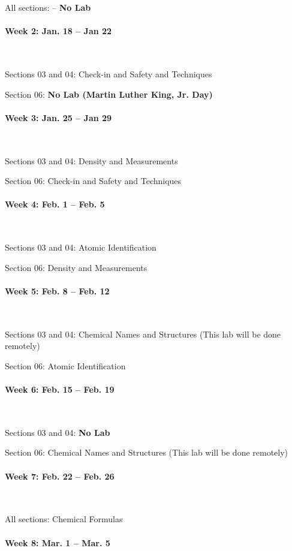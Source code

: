 \documentclass[12pt, letterpaper]{article}
\begin{document}
All sections: -- \textbf{No Lab}

\paragraph{Week 2: Jan. 18 -- Jan 22}~ 

Sections 03 and 04: Check-in and Safety and Techniques

Section 06: \textbf{No Lab (Martin Luther King, Jr. Day)}

\paragraph{Week 3:  Jan. 25 -- Jan 29}~

Sections 03 and 04:  Density and Measurements

Section 06: Check-in and Safety and Techniques

\paragraph{Week 4: Feb. 1 -- Feb. 5}~

Sections 03 and 04: Atomic Identification

Section 06: Density and Measurements

\paragraph{Week 5: Feb. 8 -- Feb. 12}~

Sections 03 and 04:  Chemical Names and Structures (This lab will be done remotely)

Section 06: Atomic Identification

\paragraph{Week 6: Feb. 15 -- Feb. 19}~ 

Sections 03 and 04:  \textbf{No Lab}

Section 06: Chemical Names and Structures (This lab will be done remotely)

\paragraph{Week 7: Feb. 22 -- Feb. 26}~

All sections: Chemical Formulas

\paragraph{Week 8: Mar. 1 -- Mar. 5}~ 
\end{document}
